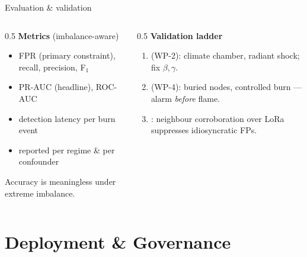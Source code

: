 \documentclass[aspectratio=169,11pt]{beamer}
\newcommand{\src}[1]{{\scriptsize\color{aegisLeaf}#1}}
\begin{document}
\begin{frame}{Evaluation \& validation}
  \begin{columns}[T]
    \begin{column}{0.5\textwidth}
      \textbf{Metrics} (imbalance-aware)
      \begin{itemize}\small
        \item FPR (primary constraint), recall, precision, F$_1$
        \item PR-AUC (headline), ROC-AUC
        \item detection latency per burn event
        \item \alert{reported per regime \& per confounder}
      \end{itemize}
      \src{Accuracy is meaningless under extreme imbalance.}
    \end{column}
    \begin{column}{0.5\textwidth}
      \textbf{Validation ladder}
      \begin{enumerate}\small
        \item {} (WP-2): climate chamber, radiant shock; fix $\beta,\gamma$.
        \item {} (WP-4): buried nodes, controlled burn — alarm \emph{before} flame.
        \item {}: neighbour corroboration over LoRa suppresses idiosyncratic FPs.
      \end{enumerate}
    \end{column}
  \end{columns}
\end{frame}

\section{Deployment \& Governance}
\end{document}
